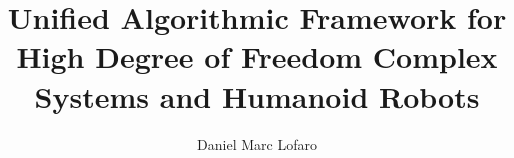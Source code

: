 \documentclass[12pt, letterpaper]{drexelthesis}
\author{Daniel Marc Lofaro}
\title{Unified Algorithmic Framework for High Degree of Freedom Complex Systems and Humanoid Robots}
\begin{document}
 



	\doublespacing
	\maketitle 
\begin{preliminary}
	\sloppy
	\copyrightpage
	
	
	
	\mytableofcontents
	\mylistoftables
	\mylistoffigures
	
\end{preliminary}

\begin{thesis}
	\fussy
	
%	
	
	
	
%	
	

	\singlespacing
%	
%	
	
	
%	

	\appendix
	
	
	
	
	
	
	
	
	
	
	
	
	
%	
%	
%	
%	
%	
%	
        
\end{thesis}
\end{document}
